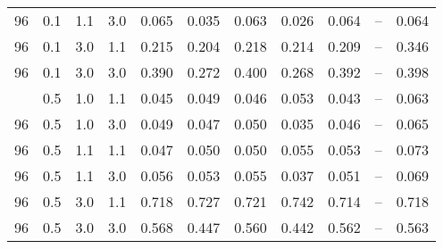 \begin{longtable}[t]{ccccrrrrrrc}
96 & 0.1 & 1.1 & 3.0 & 0.065 & 0.035 & 0.063 & 0.026 & 0.064 & -- & 0.064\\
96 & 0.1 & 3.0 & 1.1 & 0.215 & 0.204 & 0.218 & 0.214 & 0.209 & -- & 0.346\\
96 & 0.1 & 3.0 & 3.0 & 0.390 & 0.272 & 0.400 & 0.268 & 0.392 & -- & 0.398\\
\addlinespace
96 & 0.5 & 1.0 & 1.1 & 0.045 & 0.049 & 0.046 & 0.053 & 0.043 & -- & 0.063\\
96 & 0.5 & 1.0 & 3.0 & 0.049 & 0.047 & 0.050 & 0.035 & 0.046 & -- & 0.065\\
96 & 0.5 & 1.1 & 1.1 & 0.047 & 0.050 & 0.050 & 0.055 & 0.053 & -- & 0.073\\
96 & 0.5 & 1.1 & 3.0 & 0.056 & 0.053 & 0.055 & 0.037 & 0.051 & -- & 0.069\\
96 & 0.5 & 3.0 & 1.1 & 0.718 & 0.727 & 0.721 & 0.742 & 0.714 & -- & 0.718\\
96 & 0.5 & 3.0 & 3.0 & 0.568 & 0.447 & 0.560 & 0.442 & 0.562 & -- & 0.563\\
\bottomrule
\end{longtable}
\endgroup{}
